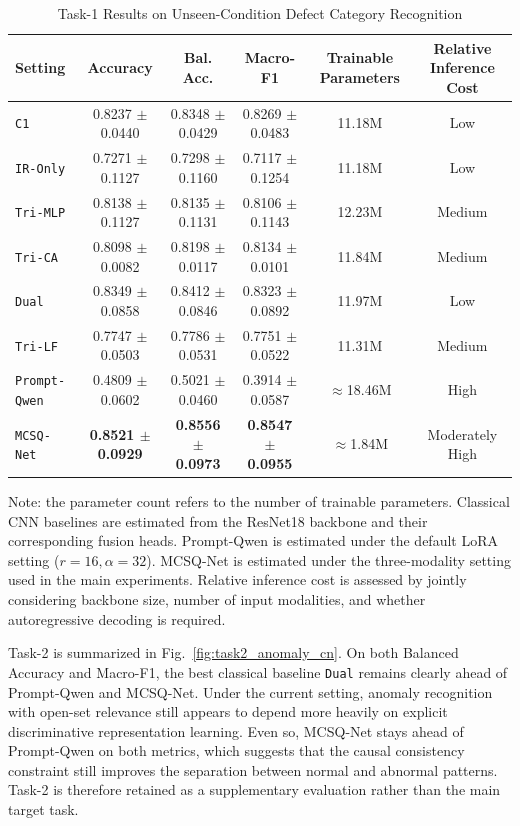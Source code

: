 \documentclass[journal]{IEEEtran}
\begin{document}
\begin{table}[!t]
\caption{Task-1 Results on Unseen-Condition Defect Category Recognition}
\label{tab:data1_main_cn}
\centering
\footnotesize
\setlength{\tabcolsep}{4.2pt}
\begin{tabular*}{\textwidth}{@{\extracolsep{\fill}}lccccc@{}}
\toprule
Setting & Accuracy & Bal. Acc. & Macro-F1 & Trainable Parameters & Relative Inference Cost \\
\midrule
\texttt{C1} & 0.8237 $\pm$ 0.0440 & 0.8348 $\pm$ 0.0429 & 0.8269 $\pm$ 0.0483 & 11.18M & Low \\
\texttt{IR-Only} & 0.7271 $\pm$ 0.1127 & 0.7298 $\pm$ 0.1160 & 0.7117 $\pm$ 0.1254 & 11.18M & Low \\
\texttt{Tri-MLP} & 0.8138 $\pm$ 0.1127 & 0.8135 $\pm$ 0.1131 & 0.8106 $\pm$ 0.1143 & 12.23M & Medium \\
\texttt{Tri-CA} & 0.8098 $\pm$ 0.0082 & 0.8198 $\pm$ 0.0117 & 0.8134 $\pm$ 0.0101 & 11.84M & Medium \\
\texttt{Dual} & 0.8349 $\pm$ 0.0858 & 0.8412 $\pm$ 0.0846 & 0.8323 $\pm$ 0.0892 & 11.97M & Low \\
\texttt{Tri-LF} & 0.7747 $\pm$ 0.0503 & 0.7786 $\pm$ 0.0531 & 0.7751 $\pm$ 0.0522 & 11.31M & Medium \\
\texttt{Prompt-Qwen} & 0.4809 $\pm$ 0.0602 & 0.5021 $\pm$ 0.0460 & 0.3914 $\pm$ 0.0587 & $\approx$18.46M & High \\
\texttt{MCSQ-Net} & \textbf{0.8521 $\pm$ 0.0929} & \textbf{0.8556 $\pm$ 0.0973} & \textbf{0.8547 $\pm$ 0.0955} & $\approx$1.84M & Moderately High \\
\bottomrule
\end{tabular*}
\vspace{2pt}
{\footnotesize Note: the parameter count refers to the number of trainable parameters. Classical CNN baselines are estimated from the ResNet18 backbone and their corresponding fusion heads. Prompt-Qwen is estimated under the default LoRA setting ($r=16,\alpha=32$). MCSQ-Net is estimated under the three-modality setting used in the main experiments. Relative inference cost is assessed by jointly considering backbone size, number of input modalities, and whether autoregressive decoding is required.}
\end{table}

Task-2 is summarized in Fig.~\ref{fig:task2_anomaly_cn}. On both Balanced Accuracy and Macro-F1, the best classical baseline \texttt{Dual} remains clearly ahead of Prompt-Qwen and MCSQ-Net. Under the current setting, anomaly recognition with open-set relevance still appears to depend more heavily on explicit discriminative representation learning. Even so, MCSQ-Net stays ahead of Prompt-Qwen on both metrics, which suggests that the causal consistency constraint still improves the separation between normal and abnormal patterns. Task-2 is therefore retained as a supplementary evaluation rather than the main target task.
\end{document}
